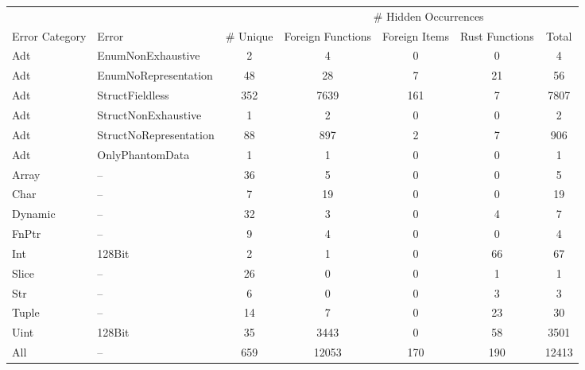 \begin{tabular}{llc|cccc}
  \hline
  & & & \multicolumn{4}{c}{\# Hidden Occurrences} \\
 Error Category & Error & \# Unique & Foreign Functions & Foreign Items & Rust Functions & Total \\
 \hline
Adt & EnumNonExhaustive & 2 & 4 & 0 & 0 & 4 \\ 
  Adt & EnumNoRepresentation & 48 & 28 & 7 & 21 & 56 \\ 
  Adt & StructFieldless & 352 & 7639 & 161 & 7 & 7807 \\ 
  Adt & StructNonExhaustive & 1 & 2 & 0 & 0 & 2 \\ 
  Adt & StructNoRepresentation & 88 & 897 & 2 & 7 & 906 \\ 
  Adt & OnlyPhantomData & 1 & 1 & 0 & 0 & 1 \\ 
  Array & -- & 36 & 5 & 0 & 0 & 5 \\ 
  Char & -- & 7 & 19 & 0 & 0 & 19 \\ 
  Dynamic & -- & 32 & 3 & 0 & 4 & 7 \\ 
  FnPtr & -- & 9 & 4 & 0 & 0 & 4 \\ 
  Int & 128Bit & 2 & 1 & 0 & 66 & 67 \\ 
  Slice & -- & 26 & 0 & 0 & 1 & 1 \\ 
  Str & -- & 6 & 0 & 0 & 3 & 3 \\ 
  Tuple & -- & 14 & 7 & 0 & 23 & 30 \\ 
  Uint & 128Bit & 35 & 3443 & 0 & 58 & 3501 \\ 
  All & -- & 659 & 12053 & 170 & 190 & 12413 \\ 
   \hline
\end{tabular}

